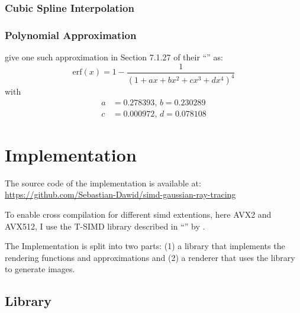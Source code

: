\documentclass[a4paper, 11pt]{memoir}
\newcommand*{\erf}{\text{erf}}
\begin{document}
    \subsection{Cubic Spline Interpolation}
    \subsection{Polynomial Approximation}
    \citeauthor{AbraSteg72} give one such approximation in Section 7.1.27 of their \enquote{}\cite{AbraSteg72} as:
    \begin{equation}
        \erf{(x)} = 1 - \frac{1}{(1 + ax + bx^2 + cx^3 + dx^4)^4}
    \end{equation}
    with
    \begin{align*}
        a &= 0.278393,\,
        b = 0.230289\\
        c &= 0.000972,\,
        d = 0.078108
    \end{align*}
    
    \chapter{Implementation}
    The source code of the implementation is available at: \href{https://github.com/Sebastian-Dawid/simd-gaussian-ray-tracing}{https://github.com/Sebastian-Dawid/simd-gaussian-ray-tracing}

    To enable cross compilation for different \gls{simd} extentions, here AVX2 and AVX512, I use the T-SIMD library described in \enquote{} \cite{own_moeller_16_2} by \citeauthor{own_moeller_16_2}.

    The Implementation is split into two parts: (1) a library that implements the rendering functions and approximations and (2) a renderer that uses the library to generate images.
    
    \section{Library}
\end{document}
